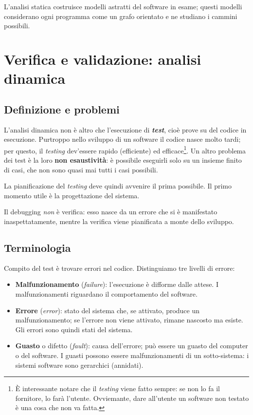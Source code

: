 \documentclass[a4paper]{article}
\begin{document}
		
L'analisi statica costruisce modelli astratti del software in esame; questi modelli considerano ogni programma come un grafo orientato e ne studiano i cammini possibili.
	


		
	\section{Verifica e validazione: analisi dinamica}


		
	\subsection{Definizione e problemi}

		
L'analisi dinamica non è altro che l'esecuzione di \textbf{\emph{test}}, cioè prove su del codice in esecuzione. Purtroppo nello sviluppo di un software il codice nasce molto tardi; per questo, il \emph{testing} dev'essere rapido (efficiente) ed efficace\footnote{È interessante notare che il \emph{testing} viene fatto sempre: se non lo fa il fornitore, lo farà l'utente. Ovviemante, dare all'utente un software non testato è una cosa che non va fatta.}. Un altro problema dei test è la loro \textbf{non esaustività}: è possibile eseguirli solo su un insieme finito di casi, che non sono quasi mai tutti i casi possibili.
		
La pianificazione del \emph{testing} deve quindi avvenire il prima possibile. Il primo momento utile è la progettazione del sistema.
		
Il debugging \emph{non} è verifica: esso nasce da un errore che si è manifestato inaspettatamente, mentre la verifica viene pianificata a monte dello sviluppo.

		
	\subsection{Terminologia}

		
Compito del test è trovare errori nel codice. Distinguiamo tre livelli di errore:
		
	\begin{itemize}
		
			
	\item \textbf{Malfunzionamento} (\emph{failure}): l'esecuzione è difforme dalle attese. I malfunzionamenti riguardano il comportamento del software.
			
	\item \textbf{Errore} (\emph{error}): stato del sistema che, se attivato, produce un malfunzionamento; se l'errore non viene attivato, rimane nascosto ma esiste. Gli errori sono quindi stati del sistema.
			
	\item \textbf{Guasto} o difetto (\emph{fault}): causa dell'errore; può essere un guasto del computer o del software. I guasti possono essere malfunzionamenti di un sotto-sistema: i sistemi software sono gerarchici (annidati).
		
	\end{itemize}
\end{document}
